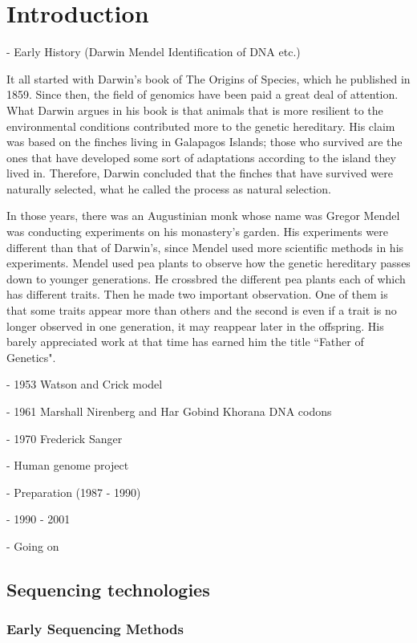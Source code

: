 \chapter{Introduction}
- Early History (Darwin Mendel Identification of DNA etc.)

It all started with Darwin's book of The Origins of Species, which he published in 1859. Since then, the field of genomics have been paid a great deal of attention. What Darwin argues in his book is that animals that is more resilient to the environmental conditions contributed more to the genetic hereditary. His claim was based on the finches living in Galapagos Islands; those who survived are the ones that have developed some sort of adaptations according to the island they lived in. Therefore, Darwin concluded that the finches that have survived were naturally selected, what he called the process as natural selection.

In those years, there was an Augustinian monk whose name was Gregor Mendel was conducting experiments on his monastery's garden. His experiments were different than that of Darwin's, since Mendel used more scientific methods in his experiments. Mendel used pea plants to observe how the genetic hereditary passes down to younger generations. He crossbred the different pea plants each of which has different traits. Then he made two important observation. One of them is that some traits appear more than others and the second is even if a trait is no longer observed in one generation, it may reappear later in the offspring. His barely appreciated work at that time has earned him the title ``Father of Genetics".



- 1953 Watson and Crick model

- 1961 Marshall Nirenberg and Har Gobind Khorana DNA codons

- 1970 Frederick Sanger

- Human genome project

    - Preparation (1987 - 1990)

    - 1990 - 2001
    
    - Going on

\newpage
\section{Sequencing technologies}

\subsection{Early Sequencing Methods}
